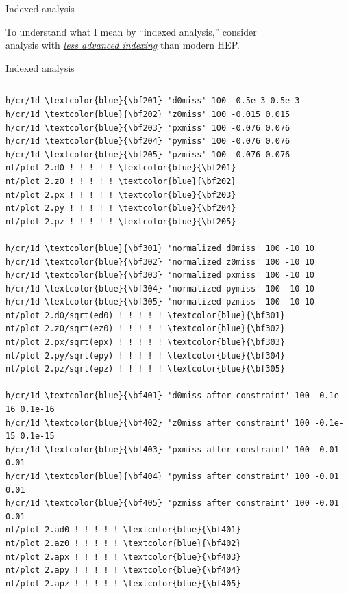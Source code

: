 \documentclass[aspectratio=169]{beamer}
\begin{document}
\begin{frame}{Indexed analysis}
\Large
\vspace{0.5 cm}
\begin{center}
To understand what I mean by ``indexed analysis,'' consider \\
analysis with \underline{\it less advanced indexing} than modern HEP.
\end{center}
\end{frame}

\begin{frame}[fragile]{Indexed analysis}
\vspace{0.1 cm}
\begin{columns}
\tiny
\begin{Verbatim}[commandchars=\\\{\}]
h/cr/1d \textcolor{blue}{\bf201} 'd0miss' 100 -0.5e-3 0.5e-3
h/cr/1d \textcolor{blue}{\bf202} 'z0miss' 100 -0.015 0.015
h/cr/1d \textcolor{blue}{\bf203} 'pxmiss' 100 -0.076 0.076
h/cr/1d \textcolor{blue}{\bf204} 'pymiss' 100 -0.076 0.076
h/cr/1d \textcolor{blue}{\bf205} 'pzmiss' 100 -0.076 0.076
nt/plot 2.d0 ! ! ! ! ! \textcolor{blue}{\bf201}
nt/plot 2.z0 ! ! ! ! ! \textcolor{blue}{\bf202}
nt/plot 2.px ! ! ! ! ! \textcolor{blue}{\bf203}
nt/plot 2.py ! ! ! ! ! \textcolor{blue}{\bf204}
nt/plot 2.pz ! ! ! ! ! \textcolor{blue}{\bf205}

h/cr/1d \textcolor{blue}{\bf301} 'normalized d0miss' 100 -10 10
h/cr/1d \textcolor{blue}{\bf302} 'normalized z0miss' 100 -10 10
h/cr/1d \textcolor{blue}{\bf303} 'normalized pxmiss' 100 -10 10
h/cr/1d \textcolor{blue}{\bf304} 'normalized pymiss' 100 -10 10
h/cr/1d \textcolor{blue}{\bf305} 'normalized pzmiss' 100 -10 10
nt/plot 2.d0/sqrt(ed0) ! ! ! ! ! \textcolor{blue}{\bf301}
nt/plot 2.z0/sqrt(ez0) ! ! ! ! ! \textcolor{blue}{\bf302}
nt/plot 2.px/sqrt(epx) ! ! ! ! ! \textcolor{blue}{\bf303}
nt/plot 2.py/sqrt(epy) ! ! ! ! ! \textcolor{blue}{\bf304}
nt/plot 2.pz/sqrt(epz) ! ! ! ! ! \textcolor{blue}{\bf305}

h/cr/1d \textcolor{blue}{\bf401} 'd0miss after constraint' 100 -0.1e-16 0.1e-16
h/cr/1d \textcolor{blue}{\bf402} 'z0miss after constraint' 100 -0.1e-15 0.1e-15
h/cr/1d \textcolor{blue}{\bf403} 'pxmiss after constraint' 100 -0.01 0.01
h/cr/1d \textcolor{blue}{\bf404} 'pymiss after constraint' 100 -0.01 0.01
h/cr/1d \textcolor{blue}{\bf405} 'pzmiss after constraint' 100 -0.01 0.01
nt/plot 2.ad0 ! ! ! ! ! \textcolor{blue}{\bf401}
nt/plot 2.az0 ! ! ! ! ! \textcolor{blue}{\bf402}
nt/plot 2.apx ! ! ! ! ! \textcolor{blue}{\bf403}
nt/plot 2.apy ! ! ! ! ! \textcolor{blue}{\bf404}
nt/plot 2.apz ! ! ! ! ! \textcolor{blue}{\bf405}
\end{Verbatim}


\end{columns}
\end{frame}
\end{document}
